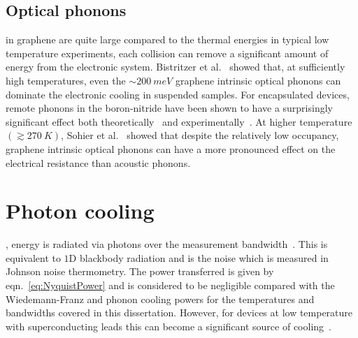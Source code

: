 \subsection{Optical phonons}

 in graphene are quite large compared to the thermal energies in typical low temperature experiments, each collision can remove a significant amount of energy from the electronic system. Bistritzer et al.~\cite{bistritzer_electronic_2009} showed that, at sufficiently high temperatures, even the ${\sim}200~meV$ graphene intrinsic optical phonons can dominate the electronic cooling in suspended samples. For encapsulated devices, remote phonons in the boron-nitride have been shown to have a surprisingly significant effect both theoretically~\cite{viljas_electron-phonon_2010, bistritzer_electronic_2009, low_cooling_2012} and experimentally~\cite{tielrooij_out--plane_2017}. At higher temperature $\left( \gtrsim 270~K\right)$, Sohier et al.~\cite{sohier_phonon-limited_2014} showed that despite the relatively low occupancy, graphene intrinsic optical phonons can have a more pronounced effect on the electrical resistance than acoustic phonons.

\section{Photon cooling}
, energy is radiated via photons over the measurement bandwidth~\cite{schmidt_photon-mediated_2004, mckitterick_prospects_2015}. This is equivalent to $1$D blackbody radiation and is the noise which is measured in Johnson noise thermometry. The power transferred is given by eqn.~\ref{eq:NyquistPower} and is considered to be negligible compared with the Wiedemann-Franz and phonon cooling powers for the temperatures and bandwidths covered in this dissertation. However, for devices at low temperature with superconducting leads this can become a significant source of cooling~\cite{mckitterick_prospects_2015}.

